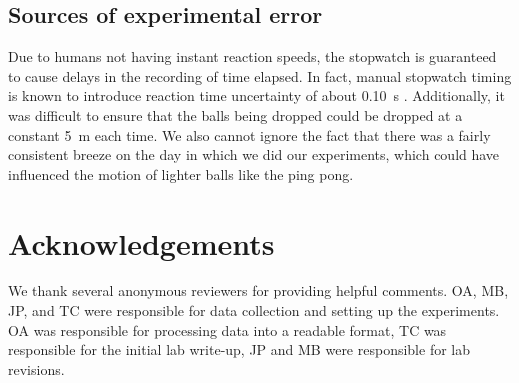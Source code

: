 \documentclass[reprint,amsmath,amssymb,aps,twoside]{revtex4-2}
\begin{document}
\subsection{Sources of experimental error}
Due to humans not having instant reaction speeds, the stopwatch is guaranteed to cause delays in the recording of time elapsed. In fact, manual stopwatch timing is known to introduce reaction time uncertainty of about \qty{0.10}{\second} \cite{faux:2019:manual, hetzler:2008:reliability}. Additionally, it was difficult to ensure that the balls being dropped could be dropped at a constant \qty{5}{\meter} each time. We also cannot ignore the fact that there was a fairly consistent breeze on the day in which we did our experiments, which could have influenced the motion of lighter balls like the ping pong.





\section{Acknowledgements} 
We thank several anonymous reviewers for providing helpful comments. OA, MB, JP, and TC were responsible for data collection and setting up the experiments. OA was responsible for processing data into a readable format, TC was responsible for the initial lab write-up, JP and MB were responsible for lab revisions.







\end{document}
